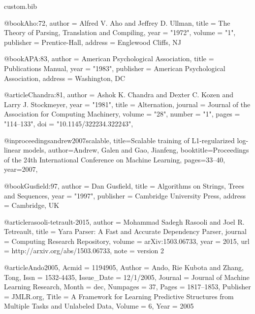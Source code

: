 \begin{filecontents*}[overwrite]{custom.bib}


@book{Aho:72,
    author  = {Alfred V. Aho and Jeffrey D. Ullman},
    title   = {The Theory of Parsing, Translation and Compiling},
    year    = "1972",
    volume  = "1",
    publisher = {Prentice-Hall},
    address = {Englewood Cliffs, NJ}
}

@book{APA:83,
    author  = {{American Psychological Association}},
    title   = {Publications Manual},
    year    = "1983",
    publisher = {American Psychological Association},
    address = {Washington, DC}
}

@article{Chandra:81,
	author = {Ashok K. Chandra and Dexter C. Kozen and Larry J. Stockmeyer},
	year = "1981",
	title = {Alternation},
	journal = {Journal of the Association for Computing Machinery},
	volume = "28",
	number = "1",
	pages = "114--133",
	doi = "10.1145/322234.322243",
}

@inproceedings{andrew2007scalable,
  title={Scalable training of {L1}-regularized log-linear models},
  author={Andrew, Galen and Gao, Jianfeng},
  booktitle={Proceedings of the 24th International Conference on Machine Learning},
  pages={33--40},
  year={2007},
}

@book{Gusfield:97,
    author  = {Dan Gusfield},
    title   = {Algorithms on Strings, Trees and Sequences},
    year    = "1997",
    publisher = {Cambridge University Press},
    address = {Cambridge, UK}
}

@article{rasooli-tetrault-2015,
    author    = {Mohammad Sadegh Rasooli and Joel R. Tetreault},
    title     = {Yara Parser: {A} Fast and Accurate Dependency Parser},
    journal   = {Computing Research Repository},
    volume    = {arXiv:1503.06733},
    year      = {2015},
    url       = {http://arxiv.org/abs/1503.06733},
    note    = {version 2}
}

@article{Ando2005,
	Acmid = {1194905},
	Author = {Ando, Rie Kubota and Zhang, Tong},
	Issn = {1532-4435},
	Issue_Date = {12/1/2005},
	Journal = {Journal of Machine Learning Research},
	Month = dec,
	Numpages = {37},
	Pages = {1817--1853},
	Publisher = {JMLR.org},
	Title = {A Framework for Learning Predictive Structures from Multiple Tasks and Unlabeled Data},
	Volume = {6},
	Year = {2005}
}


\end{filecontents*}
